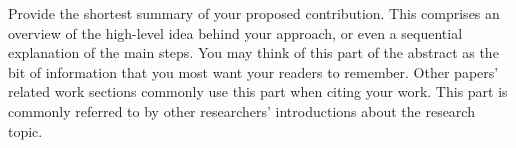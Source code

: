 


\noindent 
Provide the shortest summary of your proposed contribution.
This comprises an overview of the high-level idea behind your approach, or even a sequential explanation of the main steps.
You may think of this part of the abstract as the bit of information that you most want your readers to remember.
Other papers' related work sections commonly use this part when citing your work.
This part is commonly referred to by other researchers' introductions about the research topic.
